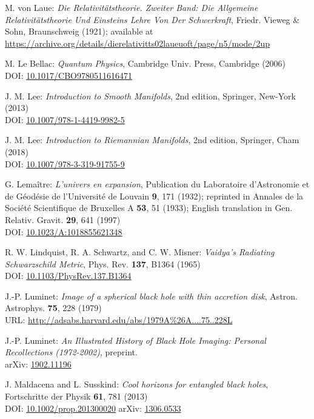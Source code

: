 \begin{thebibliography}{123}
M. von Laue: {\em Die Relativitätstheorie. Zweiter Band: Die Allgemeine Relativitätstheorie Und Einsteins Lehre Von Der Schwerkraft},
Friedr. Vieweg \& Sohn, Braunschweig (1921); available at \\
\url{https://archive.org/details/dierelativitts02laueuoft/page/n5/mode/2up}

M. Le Bellac:
{\em Quantum Physics},
Cambridge Univ. Press, Cambridge (2006)\\
DOI: \href{https://doi.org/10.1017/CBO9780511616471}{10.1017/CBO9780511616471}

J. M. Lee: {\em Introduction to Smooth Manifolds}, 2nd edition,
Springer, New-York (2013)\\
DOI: \href{https://doi.org/10.1007/978-1-4419-9982-5}{10.1007/978-1-4419-9982-5}

J. M. Lee: {\em Introduction to Riemannian Manifolds}, 2nd edition,
Springer, Cham (2018)\\
DOI: \href{https://doi.org/10.1007/978-3-319-91755-9}{10.1007/978-3-319-91755-9}

G. Lemaître: {\em L'univers en expansion},
Publication du Laboratoire d'Astronomie et de Géodésie de l'Université
de Louvain {\bf 9},  171 (1932); reprinted in
Annales de la Société Scientifique de Bruxelles A {\bf 53}, 51 (1933);
English translation in
Gen. Relativ. Gravit. {\bf 29}, 641 (1997)\\
DOI: \href{https://doi.org/10.1023/A:1018855621348}{10.1023/A:1018855621348}

R. W. Lindquist, R. A. Schwartz, and C. W. Misner:
{\em Vaidya's Radiating Schwarzschild Metric},
Phys. Rev. {\bf 137}, B1364 (1965)\\
DOI: \href{https://doi.org/10.1103/PhysRev.137.B1364}{10.1103/PhysRev.137.B1364}

J.-P. Luminet: {\em Image of a spherical black hole with thin accretion disk},
Astron. Astrophys. {\bf 75}, 228 (1979)\\
URL: \url{http://adsabs.harvard.edu/abs/1979A%26A....75..228L}

J.-P. Luminet:
{\em An Illustrated History of Black Hole Imaging: Personal Recollections (1972-2002)}, preprint.\\
arXiv: \href{https://arxiv.org/abs/1902.11196}{1902.11196}

J. Maldacena and L. Susskind:
{\em Cool horizons for entangled black holes},
Fortschritte der Physik {\bf 61}, 781 (2013)\\
DOI: \href{https://doi.org/10.1002/prop.201300020}{10.1002/prop.201300020}\hfill
arXiv: \href{https://arxiv.org/abs/1306.0533}{1306.0533}


\end{thebibliography}
